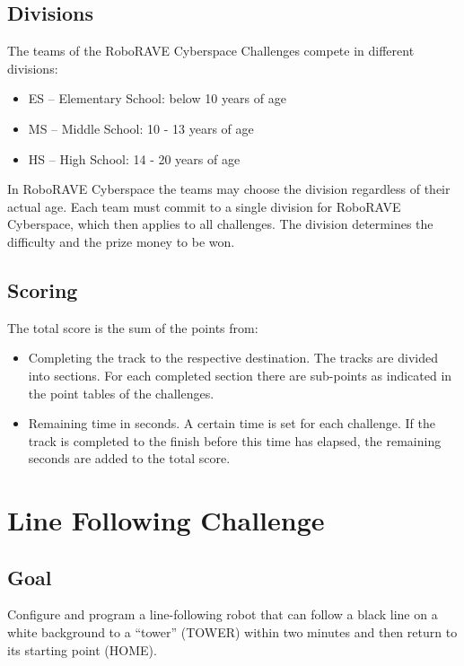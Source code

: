 \documentclass[a4paper,12pt]{article}
\begin{document}
\subsection{Divisions}

The teams of the RoboRAVE Cyberspace Challenges compete in different divisions:

\begin{itemize}
	\item ES – Elementary School: below 10 years of age
	\item MS – Middle School: 10 - 13 years of age
	\item HS – High School: 14 - 20 years of age
\end{itemize}

In RoboRAVE Cyberspace the teams may choose the division regardless of their
actual age. Each team must commit to a single division for RoboRAVE Cyberspace,
which then applies to all challenges. The division determines the difficulty
and the prize money to be won.

\subsection{Scoring}

The total score is the sum of the points from:
\begin{itemize}
	\item Completing the track to the respective destination. The tracks
		are divided into sections. For each completed section there are
		sub-points as indicated in the point tables of the challenges.
	\item Remaining time in seconds. A certain time is set for each
		challenge. If the track is completed to the finish before this
		time has elapsed, the remaining seconds are added to the total
		score.
\end{itemize}

\section{Line Following Challenge}

\subsection{Goal}

Configure and program a line-following robot that can follow a black line on a
white background to a "`tower"' (TOWER) within two minutes and then return to
its starting point (HOME).
\end{document}
